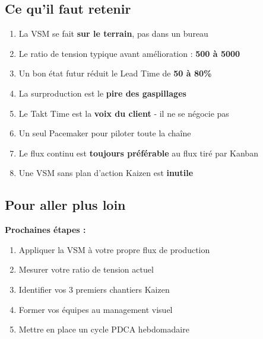\documentclass[12pt,a4paper]{article}
\begin{document}
\subsection{Ce qu'il faut retenir}

\begin{tcolorbox}[colback=green!5, colframe=green!50!black, title=Messages clés]
\begin{enumerate}[leftmargin=*]
    \item La VSM se fait \textbf{sur le terrain}, pas dans un bureau
    \item Le ratio de tension typique avant amélioration : \textbf{500 à 5000}
    \item Un bon état futur réduit le Lead Time de \textbf{50 à 80\%}
    \item La surproduction est le \textbf{pire des gaspillages}
    \item Le Takt Time est la \textbf{voix du client} - il ne se négocie pas
    \item Un seul Pacemaker pour piloter toute la chaîne
    \item Le flux continu est \textbf{toujours préférable} au flux tiré par Kanban
    \item Une VSM sans plan d'action Kaizen est \textbf{inutile}
\end{enumerate}
\end{tcolorbox}

\subsection{Pour aller plus loin}

\textbf{Prochaines étapes :}
\begin{enumerate}
    \item Appliquer la VSM à votre propre flux de production
    \item Mesurer votre ratio de tension actuel
    \item Identifier vos 3 premiers chantiers Kaizen
    \item Former vos équipes au management visuel
    \item Mettre en place un cycle PDCA hebdomadaire
\end{enumerate}

\vfill

\begin{center}
\end{center}
\end{document}
